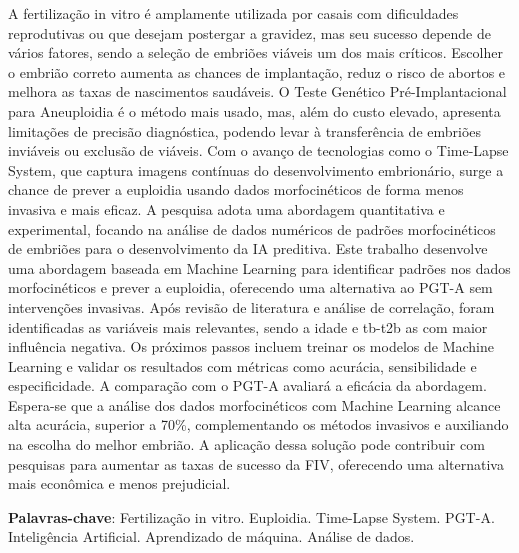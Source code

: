 \begin{resumo}
A fertilização in vitro é amplamente utilizada por casais com dificuldades reprodutivas ou que desejam postergar a gravidez, mas seu sucesso depende de vários fatores, sendo a seleção de embriões viáveis um dos mais críticos. Escolher o embrião correto aumenta as chances de implantação, reduz o risco de abortos e melhora as taxas de nascimentos saudáveis. O Teste Genético Pré-Implantacional para Aneuploidia é o método mais usado, mas, além do custo elevado, apresenta limitações de precisão diagnóstica, podendo levar à transferência de embriões inviáveis ou exclusão de viáveis. Com o avanço de tecnologias como o Time-Lapse System, que captura imagens contínuas do desenvolvimento embrionário, surge a chance de prever a euploidia usando dados morfocinéticos de forma menos invasiva e mais eficaz. A pesquisa adota uma abordagem quantitativa e experimental, focando na análise de dados numéricos de padrões morfocinéticos de embriões para o desenvolvimento da IA preditiva. Este trabalho desenvolve uma abordagem baseada em Machine Learning para identificar padrões nos dados morfocinéticos e prever a euploidia, oferecendo uma alternativa ao PGT-A sem intervenções invasivas. Após revisão de literatura e análise de correlação, foram identificadas as variáveis mais relevantes, sendo a idade e tb-t2b as com maior influência negativa. Os próximos passos incluem treinar os modelos de Machine Learning e validar os resultados com métricas como acurácia, sensibilidade e especificidade. A comparação com o PGT-A avaliará a eficácia da abordagem. Espera-se que a análise dos dados morfocinéticos com Machine Learning alcance alta acurácia, superior a 70\%, complementando os métodos invasivos e auxiliando na escolha do melhor embrião. A aplicação dessa solução pode contribuir com pesquisas para aumentar as taxas de sucesso da FIV, oferecendo uma alternativa mais econômica e menos prejudicial.
\vspace{\onelineskip}
    
\noindent
\textbf{Palavras-chave}: Fertilização in vitro. Euploidia. Time-Lapse System. PGT-A. Inteligência Artificial. Aprendizado de máquina. Análise de dados.

\end{resumo}
